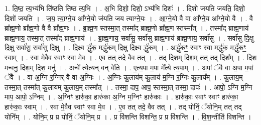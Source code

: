 \documentclass[17pt]{extarticle}
\begin{document}
1. ति॒ष्ठ॒ त्य॒भ्य॑भि ति॑ष्ठति तिष्ठ त्य॒भि । . अ॒भि दिशो॒ दिशो॒ ऽभ्य॑भि दिशः॑ । . दिशो॑ जयति जयति॒ दिशो॒ दिशो॑ जयति । . ज॒य॒ त्या॒ग्ने॒य आ᳚ग्ने॒यो ज॑यति जय त्याग्ने॒यः । . आ॒ग्ने॒यो वै वा आ᳚ग्ने॒य आ᳚ग्ने॒यो वै । . वै ब्रा᳚ह्म॒णो ब्रा᳚ह्म॒णो वै वै ब्रा᳚ह्म॒णः । . ब्रा॒ह्म॒ण स्तस्मा॒त् तस्मा᳚द् ब्राह्म॒णो ब्रा᳚ह्म॒ण स्तस्मा᳚त् । . तस्मा᳚द् ब्राह्म॒णाय॑ ब्राह्म॒णाय॒ तस्मा॒त् तस्मा᳚द् ब्राह्म॒णाय॑ । . ब्रा॒ह्म॒णाय॒ सर्वा॑सु॒ सर्वा॑सु ब्राह्म॒णाय॑ ब्राह्म॒णाय॒ सर्वा॑सु । . सर्वा॑सु दि॒क्षु दि॒क्षु सर्वा॑सु॒ सर्वा॑सु दि॒क्षु । . दि॒क्ष्व र्द्धु॑क॒ मर्द्धु॑कम् दि॒क्षु दि॒क्ष्व र्द्धु॑कम् । . अर्द्धु॑कꣳ॒॒ स्वाꣳ स्वा मर्द्धु॑क॒ मर्द्धु॑कꣳ॒॒ स्वाम् । . स्वा मे॒वैव स्वाꣳ स्वा मे॒व । . ए॒व तत् तदे॒ वैव तत् । . तद् दिश॒म् दिश॒म् तत् तद् दिश᳚म् । . दिश॒ मन्वनु॒ दिश॒म् दिश॒ मनु॑ । . अन्वे᳚ त्ये॒त्यन् वन् वे॑ति । . ए॒त्य॒पा म॒पा मे᳚त्ये त्य॒पाम् । . अ॒पां ॅवै वा अ॒पा म॒पां ॅवै । . वा अ॒ग्नि र॒ग्निर् वै वा अ॒ग्निः । . अ॒ग्निः कु॒लाय॑म् कु॒लाय॑ म॒ग्नि र॒ग्निः कु॒लाय᳚म् । . कु॒लाय॒म् तस्मा॒त् तस्मा᳚त् कु॒लाय॑म् कु॒लाय॒म् तस्मा᳚त् । . तस्मा॒ दाप॒ आप॒ स्तस्मा॒त् तस्मा॒ दापः॑ । . आपो॒ ऽग्नि म॒ग्नि माप॒ आपो॒ ऽग्निम् । . अ॒ग्निꣳ हारु॑का॒ हारु॑का अ॒ग्नि म॒ग्निꣳ हारु॑काः । . हारु॑काः॒ स्वाꣳ स्वाꣳ हारु॑का॒ हारु॑काः॒ स्वाम् । . स्वा मे॒वैव स्वाꣳ स्वा मे॒व । . ए॒व तत् तदे॒ वैव तत् । . तद् योनिं॒ ॅयोनि॒म् तत् तद् योनि᳚म् । . योनि॒म् प्र प्र योनिं॒ ॅयोनि॒म् प्र । . प्र वि॑शन्ति विशन्ति॒ प्र प्र वि॑शन्ति । . वि॒श॒न्तीति॑ विशन्ति । \newline
\end{document}
